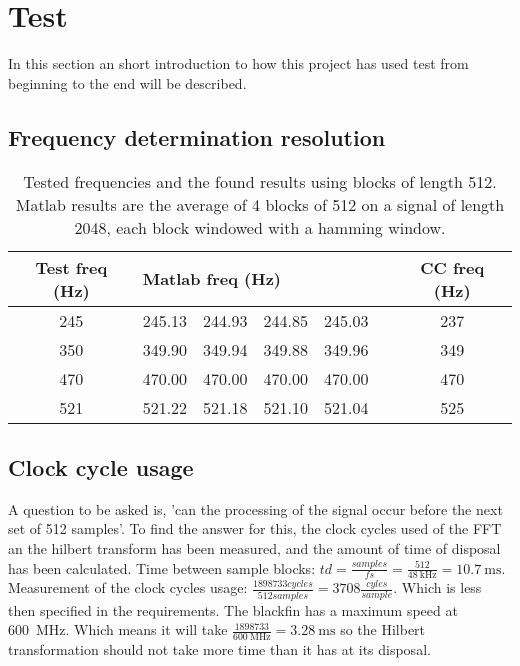 
\section{Test}
\label{sec:test}
In this section an short introduction to how this project has used test from beginning to the end will be described.
\subsection{Frequency determination resolution}
\begin{table}
	\centering
	\begin{tabular}{c | c c c c c | c}
		\toprule
		Test freq (Hz) & \multicolumn{4}{l}{Matlab freq (Hz)} & & CC freq (Hz) \\
		\midrule
		\num{245} & \num{245.13} & \num{244.93} & \num{244.85} & \num{245.03} && \num{237}\\
		\num{350} & \num{349.90} & \num{349.94} & \num{349.88} & \num{349.96} && \num{349}\\
		\num{470} & \num{470.00} & \num{470.00} & \num{470.00} & \num{470.00} && \num{470} \\
		\num{521} & \num{521.22} & \num{521.18} & \num{521.10} & \num{521.04} && \num{525} \\
		\bottomrule
	\end{tabular}
	\caption{Tested frequencies and the found results using blocks of length \num{512}. Matlab results are the average of 4 blocks of \num{512} on a signal of length \num{2048}, each block windowed with a hamming window.}
	\label{tab:test}
\end{table}

\subsection{Clock cycle usage}
A question to be asked is, 'can the processing of the signal occur before the next set of 512 samples'. To find the answer for this, the clock cycles used of the FFT an the hilbert transform has been measured, and the amount of time of disposal has been calculated.\newline
Time between sample blocks: $td = \frac{samples}{fs} = \frac{512}{\SI{48}{\kilo\hertz}} = \SI{10.7}{\milli\second}$. \newline
Measurement of the clock cycles usage: $\frac{1898733 cycles}{512 samples} = 3708 \frac{cyles}{sample}$. Which is less then specified in the requirements.  \newline
The blackfin has a maximum speed at \SI{600}{\mega\hertz}. Which means it will take $\frac{\num{1898733}}{\SI{600}{\mega\hertz}} = {\SI{3.28}{\milli\second}}$ so the Hilbert transformation should not take more time than it has at its disposal.

